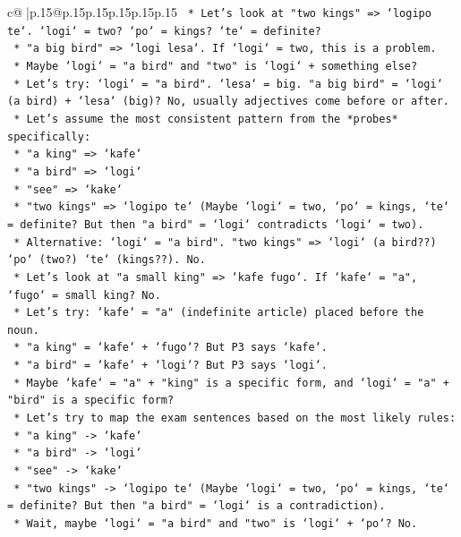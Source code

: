 \documentclass{article}
\begin{document}
{\begin{supertabular}{c@{$\;$}|p{.15\linewidth}@{}p{.15\linewidth}p{.15\linewidth}p{.15\linewidth}p{.15\linewidth}p{.15\linewidth}}
{{{\texttt{    *   Let's look at "two kings" => `logipo te`. `logi` = two? `po` = kings? `te` = definite?} \\
\texttt{    *   "a big bird" => `logi lesa`. If `logi` = two, this is a problem.} \\
\texttt{    *   Maybe `logi` = "a bird" and "two" is `logi` + something else?} \\
\texttt{    *   Let's try: `logi` = "a bird". `lesa` = big. "a big bird" = `logi` (a bird) + `lesa` (big)? No, usually adjectives come before or after.} \\
\texttt{    *   Let's assume the most consistent pattern from the *probes* specifically:} \\
\texttt{        *   "a king" => `kafe`} \\
\texttt{        *   "a bird" => `logi`} \\
\texttt{        *   "see" => `kake`} \\
\texttt{        *   "two kings" => `logipo te` (Maybe `logi` = two, `po` = kings, `te` = definite? But then "a bird" = `logi` contradicts `logi` = two).} \\
\texttt{        *   Alternative: `logi` = "a bird". "two kings" => `logi` (a bird??) `po` (two?) `te` (kings??). No.} \\
\texttt{        *   Let's look at "a small king" => `kafe fugo`. If `kafe` = "a", `fugo` = small king? No.} \\
\texttt{        *   Let's try: `kafe` = "a" (indefinite article) placed before the noun.} \\
\texttt{            *   "a king" = `kafe` + `fugo`? But P3 says `kafe`.} \\
\texttt{            *   "a bird" = `kafe` + `logi`? But P3 says `logi`.} \\
\texttt{        *   Maybe `kafe` = "a" + "king" is a specific form, and `logi` = "a" + "bird" is a specific form?} \\
\texttt{        *   Let's try to map the exam sentences based on the most likely rules:} \\
\texttt{            *   "a king" {-}> `kafe`} \\
\texttt{            *   "a bird" {-}> `logi`} \\
\texttt{            *   "see" {-}> `kake`} \\
\texttt{            *   "two kings" {-}> `logipo te` (Maybe `logi` = two, `po` = kings, `te` = definite? But then "a bird" = `logi` is a contradiction).} \\
\texttt{            *   Wait, maybe `logi` = "a bird" and "two" is `logi` + `po`? No.} \\
}}}
\end{supertabular}}
\end{document}
